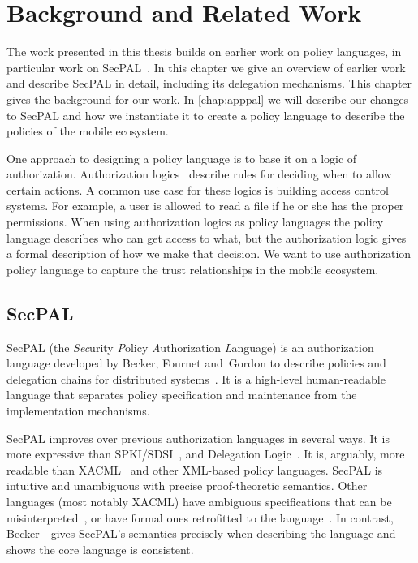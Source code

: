 \documentclass[thesis.tex]{subfiles}
\begin{document}
\chapter{Background and Related Work}
\label{chap:background}

The work presented in this thesis builds on earlier work on policy
languages, in particular work on SecPAL~\cite{becker_secpal:_2006}. In
this chapter we give an overview of earlier work and describe SecPAL
in detail, including its delegation mechanisms. This chapter gives the
background for our work. In \autoref{chap:apppal} we will describe our
changes to SecPAL and how we instantiate it to create a policy
language to describe the policies of the mobile ecosystem.

One approach to designing a policy language is to base it on a logic
of authorization. Authorization logics~\cite{abadi_calculus_1991}
describe rules for deciding when to allow certain actions. A
common use case for these logics is building access control systems. For example, a
user is allowed to read a file if he or she has the proper
permissions. When using authorization logics as policy languages
the policy language describes who can get access to what, but the
authorization logic gives a formal description of how we make that
decision. We want to use authorization policy language to capture the
trust relationships in the mobile ecosystem.

\section{SecPAL}

SecPAL (the \emph{Sec}urity \emph{P}olicy \emph{A}uthorization \emph{L}anguage) is an authorization language developed by Becker, Fournet
and~Gordon to describe policies and delegation chains for distributed
systems~\cite{becker_secpal:_2006}. It is a high-level human-readable
language that separates policy specification and maintenance from the
implementation mechanisms.

SecPAL improves over previous authorization languages in several
ways. It is more expressive than
SPKI/SDSI~\cite{ellison_spki_1999}, and Delegation
Logic~\cite{li_delegation_2003}. It is, arguably, more readable than
XACML~\cite{oasis_extensible_2013} and other XML-based policy
languages.  SecPAL is intuitive and unambiguous with precise proof-theoretic
semantics. Other languages (most notably XACML) have ambiguous
specifications that can be misinterpreted~\cite{ramli_logic_2014}, or
have formal ones retrofitted to the
language~\cite{bryans_reasoning_2005,masi_formalisation_2012}.  In
contrast, Becker~\etal~gives SecPAL's semantics precisely when
describing the language and shows the core language is consistent.
\end{document}
